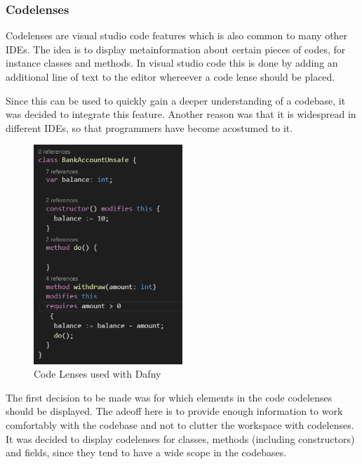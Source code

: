 \subsubsection{Codelenses} \label{codelenses}
Codelenses are visual studio code features which is also common to many other IDEs. The idea is to display metainformation about certain pieces of codes, for instance classes and methods. In visual studio code this is done  by adding an additional line of text to the editor whereever a code lense should  be placed. \newline

Since this can be used to quickly gain a deeper understanding of a codebase, it was decided to integrate this feature. Another reason was that it is widespread in different IDEs, so that programmers have become acostumed to it. \newline

\begin{figure}[H]
	\centering
	\includegraphics[width=0.5\textwidth]{img/codelensesClosed}
	\caption{Code Lenses used with Dafny}
	\label{fig:codelensesclosed}
\end{figure}

The first decision to be made was for which elements in the code codelenses should be displayed. The adeoff here is to  provide enough information to work comfortably with the codebase and not to clutter the workspace with codelenses. It was decided to display codelenses for classes, methods (including constructors) and fields, since they tend to have a wide scope in the codebases. \newline


